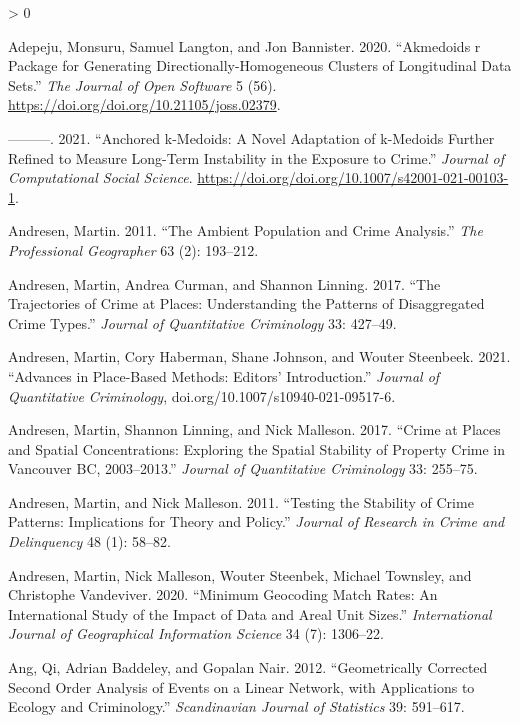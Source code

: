 \documentclass[
  krantz2]{krantz}
\newlength{\cslhangindent}
\newenvironment{CSLReferences}[2] %
 {%
  \setlength{\parindent}{0pt}
  \ifodd #1 \everypar{\setlength{\hangindent}{\cslhangindent}}\ignorespaces\fi
  \ifnum #2 > 0
  \setlength{\parskip}{#2\baselineskip}
  \fi
 }%
 {}
\begin{document}
\hypertarget{refs}{}
\begin{CSLReferences}{1}{0}
\leavevmode\hypertarget{ref-Adepeju_2020}{}%
Adepeju, Monsuru, Samuel Langton, and Jon Bannister. 2020. {``Akmedoids r Package for Generating Directionally-Homogeneous Clusters of Longitudinal Data Sets.''} \emph{The Journal of Open Software} 5 (56). \url{https://doi.org/doi.org/10.21105/joss.02379}.

\leavevmode\hypertarget{ref-Adepeju_2021}{}%
---------. 2021. {``Anchored k-Medoids: A Novel Adaptation of k-Medoids Further Refined to Measure Long-Term Instability in the Exposure to Crime.''} \emph{Journal of Computational Social Science}. \url{https://doi.org/doi.org/10.1007/s42001-021-00103-1}.

\leavevmode\hypertarget{ref-Andresen_2011}{}%
Andresen, Martin. 2011. {``The Ambient Population and Crime Analysis.''} \emph{The Professional Geographer} 63 (2): 193--212.

\leavevmode\hypertarget{ref-Andresen_2017}{}%
Andresen, Martin, Andrea Curman, and Shannon Linning. 2017. {``The Trajectories of Crime at Places: Understanding the Patterns of Disaggregated Crime Types.''} \emph{Journal of Quantitative Criminology} 33: 427--49.

\leavevmode\hypertarget{ref-Andresen_2021}{}%
Andresen, Martin, Cory Haberman, Shane Johnson, and Wouter Steenbeek. 2021. {``Advances in Place-Based Methods: Editors' Introduction.''} \emph{Journal of Quantitative Criminology}, doi.org/10.1007/s10940-021-09517-6.

\leavevmode\hypertarget{ref-Andresen_2017b}{}%
Andresen, Martin, Shannon Linning, and Nick Malleson. 2017. {``Crime at Places and Spatial Concentrations: Exploring the Spatial Stability of Property Crime in Vancouver BC, 2003--2013.''} \emph{Journal of Quantitative Criminology} 33: 255--75.

\leavevmode\hypertarget{ref-Andresen_2011b}{}%
Andresen, Martin, and Nick Malleson. 2011. {``Testing the Stability of Crime Patterns: Implications for Theory and Policy.''} \emph{Journal of Research in Crime and Delinquency} 48 (1): 58--82.

\leavevmode\hypertarget{ref-Andresen_2020}{}%
Andresen, Martin, Nick Malleson, Wouter Steenbek, Michael Townsley, and Christophe Vandeviver. 2020. {``Minimum Geocoding Match Rates: An International Study of the Impact of Data and Areal Unit Sizes.''} \emph{International Journal of Geographical Information Science} 34 (7): 1306--22.

\leavevmode\hypertarget{ref-Ang_2012}{}%
Ang, Qi, Adrian Baddeley, and Gopalan Nair. 2012. {``Geometrically Corrected Second Order Analysis of Events on a Linear Network, with Applications to Ecology and Criminology.''} \emph{Scandinavian Journal of Statistics} 39: 591--617.


\end{CSLReferences}
\end{document}

